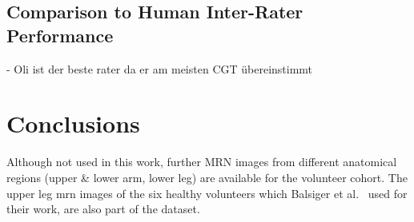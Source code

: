 \subsection{Comparison to Human Inter-Rater Performance}
- Oli ist der beste rater da er am meisten CGT übereinstimmt


\section{Conclusions} \label{disc:conclusions}


Although not used in this work, further MRN images from different anatomical regions (upper \& lower arm, lower leg) are available for the volunteer cohort. The upper leg \gls{mrn} images of the six healthy volunteers which Balsiger et al.~\cite{Balsiger2016DevelopmentApproaches} used for their work, are also part of the dataset.\\

\endinput